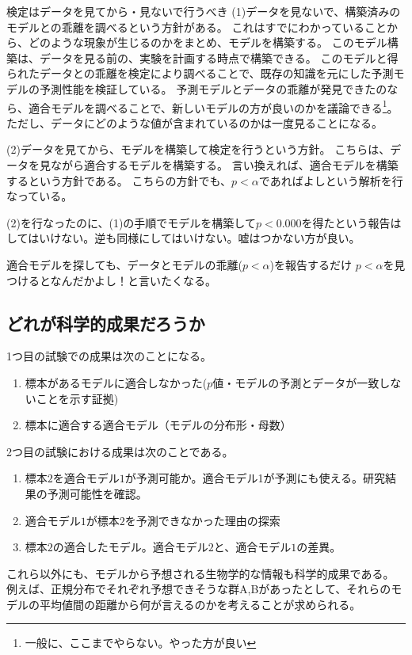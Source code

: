 \begin{SMbox}{検定はデータを見てから・見ないで行うべき}
 (1)データを見ないで、構築済みのモデルとの乖離を調べるという方針がある。
 これはすでにわかっていることから、どのような現象が生じるのかをまとめ、モデルを構築する。
 このモデル構築は、データを見る前の、実験を計画する時点で構築できる。
 このモデルと得られたデータとの乖離を検定により調べることで、既存の知識を元にした予測モデルの予測性能を検証している。
 予測モデルとデータの乖離が発見できたのなら、適合モデルを調べることで、新しいモデルの方が良いのかを議論できる\footnote{一般に、ここまでやらない。やった方が良い}。
 ただし、データにどのような値が含まれているのかは一度見ることになる。

 (2)データを見てから、モデルを構築して検定を行うという方針。
 こちらは、データを見ながら適合するモデルを構築する。
 言い換えれば、適合モデルを構築するという方針である。
 こちらの方針でも、$p<\alpha$であればよしという解析を行なっている。

 (2)を行なったのに、(1)の手順でモデルを構築して$p<0.000$を得たという報告はしてはいけない。逆も同様にしてはいけない。嘘はつかない方が良い。
\end{SMbox}

\begin{SMbox}{適合モデルを探しても、データとモデルの乖離($p<\alpha$)を報告するだけ}
 $p<\alpha$を見つけるとなんだかよし！と言いたくなる。
\end{SMbox}


\subsection{どれが科学的成果だろうか}
1つ目の試験での成果は次のことになる。
\begin{enumerate}
 \item 標本があるモデルに適合しなかった($p$値・モデルの予測とデータが一致しないことを示す証拠)
 \item 標本に適合する適合モデル（モデルの分布形・母数）
\end{enumerate}

2つ目の試験における成果は次のことである。
\begin{enumerate}
 \item 標本$2$を適合モデル$1$が予測可能か。適合モデル1が予測にも使える。研究結果の予測可能性を確認。
 \item 適合モデル$1$が標本$2$を予測できなかった理由の探索
 \item 標本$2$の適合したモデル。適合モデル$2$と、適合モデル$1$の差異。
\end{enumerate}
これら以外にも、モデルから予想される生物学的な情報も科学的成果である。
例えば、正規分布でそれぞれ予想できそうな群A,Bがあったとして、それらのモデルの平均値間の距離から何が言えるのかを考えることが求められる。



